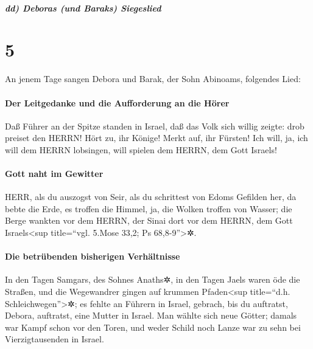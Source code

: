 \hypertarget{dd-deboras-und-baraks-siegeslied}{%
\subparagraph{dd) Deboras (und Baraks)
Siegeslied}\label{dd-deboras-und-baraks-siegeslied}}

\hypertarget{section-4}{%
\section{5}\label{section-4}}

An jenem Tage sangen Debora und Barak, der Sohn Abinoams,
folgendes Lied:

\hypertarget{der-leitgedanke-und-die-aufforderung-an-die-huxf6rer}{%
\paragraph{Der Leitgedanke und die Aufforderung an die
Hörer}\label{der-leitgedanke-und-die-aufforderung-an-die-huxf6rer}}

Daß Führer an der Spitze standen in Israel, daß das Volk
sich willig zeigte: drob preiset den HERRN! Hört zu, ihr
Könige! Merkt auf, ihr Fürsten! Ich will, ja, ich will dem HERRN
lobsingen, will spielen dem HERRN, dem Gott Israels!

\hypertarget{gott-naht-im-gewitter}{%
\paragraph{Gott naht im Gewitter}\label{gott-naht-im-gewitter}}

HERR, als du auszogst von Seir, als du schrittest von
Edoms Gefilden her, da bebte die Erde, es troffen die Himmel, ja, die
Wolken troffen von Wasser; die Berge wankten vor dem
HERRN, der Sinai dort vor dem HERRN, dem Gott Israels\textless sup
title=``vgl. 5.Mose 33,2; Ps 68,8-9''\textgreater✲.

\hypertarget{die-betruxfcbenden-bisherigen-verhuxe4ltnisse}{%
\paragraph{Die betrübenden bisherigen
Verhältnisse}\label{die-betruxfcbenden-bisherigen-verhuxe4ltnisse}}

In den Tagen Samgars, des Sohnes Anaths✲, in den Tagen
Jaels waren öde die Straßen, und die Wegewandrer gingen auf krummen
Pfaden\textless sup title=``d.h. Schleichwegen''\textgreater✲;
es fehlte an Führern in Israel, gebrach, bis du auftratst,
Debora, auftratst, eine Mutter in Israel. Man wählte sich
neue Götter; damals war Kampf schon vor den Toren, und weder Schild noch
Lanze war zu sehn bei Vierzigtausenden in Israel.

